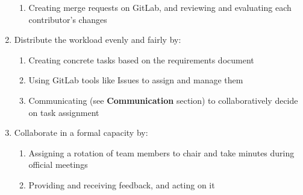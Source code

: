 \begin{enumerate}
\begin{enumerate}
        \item Creating merge requests on GitLab, and reviewing and evaluating each contributor’s changes
    \end{enumerate}
    \item Distribute the workload evenly and fairly by:
    \begin{enumerate}
        \item Creating concrete tasks based on the requirements document
        \item Using GitLab tools like Issues to assign and manage them
        \item Communicating (see \textbf{Communication} section) to collaboratively decide on task assignment
    \end{enumerate}
    \item Collaborate in a formal capacity by:
    \begin{enumerate}
        \item Assigning a rotation of team members to chair and take minutes during official meetings
        \item Providing and receiving feedback, and acting on it
    \end{enumerate}
\end{enumerate}
\par